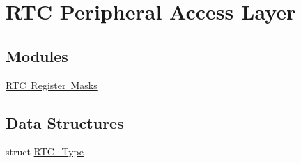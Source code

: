 \hypertarget{group___r_t_c___peripheral___access___layer}{}\section{R\+TC Peripheral Access Layer}
\label{group___r_t_c___peripheral___access___layer}
\subsection*{Modules}
\begin{DoxyCompactItemize}
\item 
\mbox{\hyperlink{group___r_t_c___register___masks}{R\+T\+C Register Masks}}
\end{DoxyCompactItemize}
\subsection*{Data Structures}
\begin{DoxyCompactItemize}
\item 
struct \mbox{\hyperlink{struct_r_t_c___type}{R\+T\+C\+\_\+\+Type}}
\end{DoxyCompactItemize}
